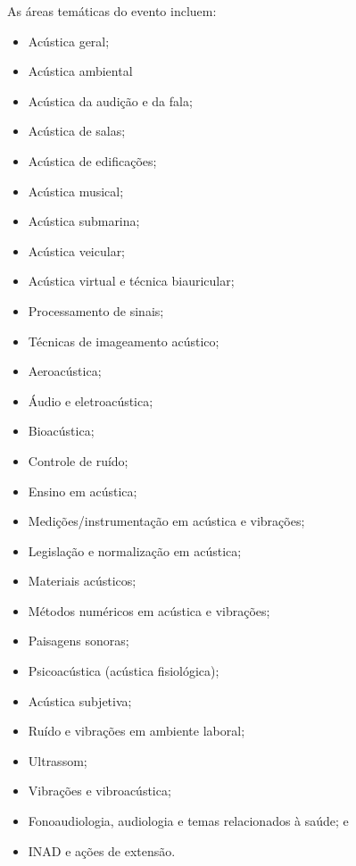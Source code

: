 \documentclass[12pt, a4paper, twoside, onecolumn]{article}
\begin{document}
\vspace{5pt}

As áreas temáticas do evento incluem:
%	
\begin{itemize}[noitemsep,topsep=-1ex] \itemsep=1.5pt
\item[\textbullet] Acústica geral; 
\item[\textbullet] Acústica ambiental
\item[\textbullet] Acústica da audição e da fala;
\item[\textbullet] Acústica de salas;
\item[\textbullet] Acústica de edificações;
\item[\textbullet] Acústica musical;
\item[\textbullet] Acústica submarina;
\item[\textbullet] Acústica veicular;
\item[\textbullet] Acústica virtual e técnica biauricular;
\item[\textbullet] Processamento de sinais;
\item[\textbullet] Técnicas de imageamento acústico;
\item[\textbullet] Aeroacústica;
\item[\textbullet] Áudio e eletroacústica;
\item[\textbullet] Bioacústica;
\item[\textbullet] Controle de ruído;
\item[\textbullet] Ensino em acústica;
\item[\textbullet] Medições/instrumentação em acústica e vibrações;
\item[\textbullet] Legislação e normalização em acústica;
\item[\textbullet] Materiais acústicos;
\item[\textbullet] Métodos numéricos em acústica e vibrações;
\item[\textbullet] Paisagens sonoras;
\item[\textbullet] Psicoacústica (acústica fisiológica);
\item[\textbullet] Acústica subjetiva;
\item[\textbullet] Ruído e vibrações em ambiente laboral;
\item[\textbullet] Ultrassom; 
\item[\textbullet] Vibrações e vibroacústica;
\item[\textbullet] Fonoaudiologia, audiologia e temas relacionados à saúde; e
\item[\textbullet] INAD e ações de extensão.
\end{itemize}
	
\end{document}
